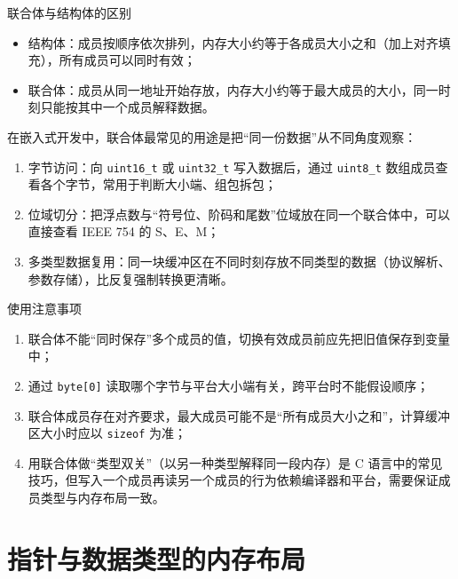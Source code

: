\begin{anybox}{联合体与结构体的区别}

\begin{itemize}
\item 结构体：成员按顺序依次排列，内存大小约等于各成员大小之和（加上对齐填充），所有成员可以同时有效；
\item 联合体：成员从同一地址开始存放，内存大小约等于最大成员的大小，同一时刻只能按其中一个成员解释数据。
\end{itemize}

在嵌入式开发中，联合体最常见的用途是把“同一份数据”从不同角度观察：

\begin{enumerate}
\item 字节访问：向 \texttt{uint16\_t} 或 \texttt{uint32\_t} 写入数据后，通过 \texttt{uint8\_t} 数组成员查看各个字节，常用于判断大小端、组包拆包；
\item 位域切分：把浮点数与“符号位、阶码和尾数”位域放在同一个联合体中，可以直接查看 IEEE 754 的 S、E、M；
\item 多类型数据复用：同一块缓冲区在不同时刻存放不同类型的数据（协议解析、参数存储），比反复强制转换更清晰。
\end{enumerate}

\end{anybox}
\begin{anybox}{使用注意事项}

\begin{enumerate}
\item 联合体不能“同时保存”多个成员的值，切换有效成员前应先把旧值保存到变量中；
\item 通过 \texttt{byte[0]} 读取哪个字节与平台大小端有关，跨平台时不能假设顺序；
\item 联合体成员存在对齐要求，最大成员可能不是“所有成员大小之和”，计算缓冲区大小时应以 \texttt{sizeof} 为准；
\item 用联合体做“类型双关”（以另一种类型解释同一段内存）是 C 语言中的常见技巧，但写入一个成员再读另一个成员的行为依赖编译器和平台，需要保证成员类型与内存布局一致。
\end{enumerate}

\end{anybox}
\section{指针与数据类型的内存布局} \label{sec:pointer-memory}

